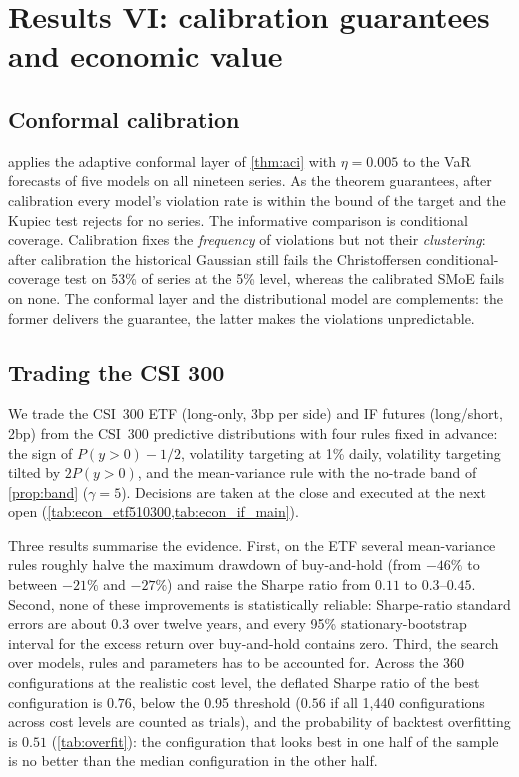\section{Results VI: calibration guarantees and economic value}\label{sec:economic}

\subsection{Conformal calibration}\label{sec:conformal-results}
 applies the adaptive conformal layer of \cref{thm:aci} with $\eta=0.005$ to the
VaR forecasts of five models on all nineteen series. As the theorem guarantees, after calibration
every model's violation rate is within the bound of the target and the Kupiec test rejects for no
series. The informative comparison is conditional coverage. Calibration fixes the \emph{frequency} of
violations but not their \emph{clustering}: after calibration the historical Gaussian still fails the
Christoffersen conditional-coverage test on 53\% of series at the 5\% level, whereas the calibrated
SMoE fails on none. The conformal layer and the distributional model are complements: the former
delivers the guarantee, the latter makes the violations unpredictable.



\subsection{Trading the CSI 300}
We trade the CSI~300 ETF (long-only, 3bp per side) and IF futures (long/short, 2bp) from the CSI~300
predictive distributions with four rules fixed in advance: the sign of $P(y>0)-1/2$, volatility
targeting at 1\% daily, volatility targeting tilted by $2P(y>0)$, and the mean-variance rule with the
no-trade band of \cref{prop:band} ($\gamma=5$). Decisions are taken at the close and executed at the
next open (\cref{tab:econ_etf510300,tab:econ_if_main}).

Three results summarise the evidence. First, on the ETF several mean-variance rules roughly halve
the maximum drawdown of buy-and-hold (from $-46\%$ to between $-21\%$ and $-27\%$) and raise the
Sharpe ratio from $0.11$ to $0.3$--$0.45$. Second, none of these improvements is statistically
reliable: Sharpe-ratio standard errors are about $0.3$ over twelve years, and every 95\%
stationary-bootstrap interval for the excess return over buy-and-hold contains zero. Third, the
search over models, rules and parameters has to be accounted for. Across the 360 configurations at the
realistic cost level, the deflated Sharpe ratio of the best configuration is $0.76$, below the 0.95
threshold ($0.56$ if all 1,440 configurations across cost levels are counted as trials), and the probability of backtest overfitting is $0.51$ (\cref{tab:overfit}): the
configuration that looks best in one half of the sample is no better than the median configuration in
the other half.

